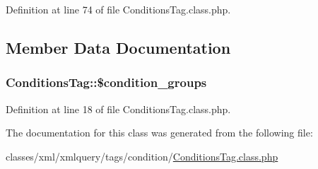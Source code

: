 Definition at line 74 of file Conditions\+Tag.\+class.\+php.



\subsection{Member Data Documentation}
\hypertarget{classConditionsTag_a494a016d168c8e44cd05638e6c991805}{
\subsubsection[{\$condition\+\_\+groups}]{\setlength{\rightskip}{0pt plus 5cm}Conditions\+Tag\+::\$condition\+\_\+groups}}\label{classConditionsTag_a494a016d168c8e44cd05638e6c991805}


Definition at line 18 of file Conditions\+Tag.\+class.\+php.



The documentation for this class was generated from the following file\+:\begin{DoxyCompactItemize}
\item 
classes/xml/xmlquery/tags/condition/\hyperlink{ConditionsTag_8class_8php}{Conditions\+Tag.\+class.\+php}\end{DoxyCompactItemize}
